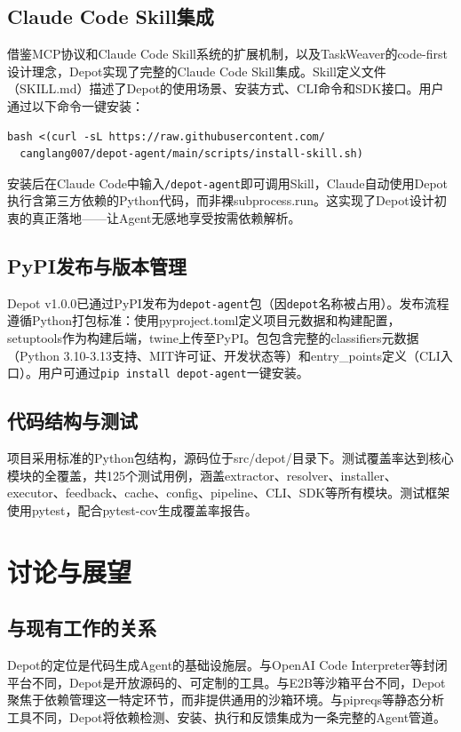 \documentclass[10pt]{ctexart}
\begin{document}
\subsection{Claude Code Skill集成}
借鉴MCP协议\cite{anthropic2025mcp}和Claude Code Skill系统\cite{anthropic2025skillsystem}的扩展机制，以及TaskWeaver\cite{qiao2024taskweaver}的code-first设计理念，Depot实现了完整的Claude Code Skill集成。Skill定义文件（SKILL.md）描述了Depot的使用场景、安装方式、CLI命令和SDK接口。用户通过以下命令一键安装：
{\small\begin{verbatim}
bash <(curl -sL https://raw.githubusercontent.com/
  canglang007/depot-agent/main/scripts/install-skill.sh)
\end{verbatim}}
安装后在Claude Code中输入\verb|/depot-agent|即可调用Skill，Claude自动使用Depot执行含第三方依赖的Python代码，而非裸subprocess.run。这实现了Depot设计初衷的真正落地——让Agent无感地享受按需依赖解析。

\subsection{PyPI发布与版本管理}
Depot v1.0.0已通过PyPI发布为\texttt{depot-agent}包（因\texttt{depot}名称被占用）\cite{pypi2024}。发布流程遵循Python打包标准\cite{pep517}：使用pyproject.toml定义项目元数据和构建配置，setuptools\cite{pypa2024setuptools}作为构建后端，twine\cite{pypa2024twine}上传至PyPI。包包含完整的classifiers元数据（Python 3.10-3.13支持、MIT许可证、开发状态等）和entry\_points定义（CLI入口）。用户可通过\verb|pip install depot-agent|一键安装。

\subsection{代码结构与测试}
项目采用标准的Python包结构，源码位于src/depot/目录下。测试覆盖率达到核心模块的全覆盖，共125个测试用例，涵盖extractor、resolver、installer、executor、feedback、cache、config、pipeline、CLI、SDK等所有模块。测试框架使用pytest，配合pytest-cov生成覆盖率报告。

\section{讨论与展望}

\subsection{与现有工作的关系}
Depot的定位是代码生成Agent的基础设施层。与OpenAI Code Interpreter\cite{openai2023code}等封闭平台不同，Depot是开放源码的、可定制的工具。与E2B\cite{e2b2024}等沙箱平台不同，Depot聚焦于依赖管理这一特定环节，而非提供通用的沙箱环境。与pipreqs等静态分析工具不同，Depot将依赖检测、安装、执行和反馈集成为一条完整的Agent管道。
\end{document}
